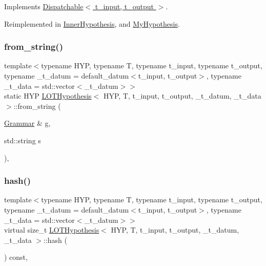 Implements \hyperlink{class_dispatchable_a6d2bd844b0e55378d29ed85e718d0a77}{Dispatchable$<$ t\+\_\+input, t\+\_\+output $>$}.



Reimplemented in \hyperlink{class_inner_hypothesis_a9aea852725a3798aafeae5e7a5a0736b}{Inner\+Hypothesis}, and \hyperlink{class_my_hypothesis_a3de47a545e8824bb8c63181965c62a01}{My\+Hypothesis}.

\mbox{\label{class_l_o_t_hypothesis_a684d3208f52e10c61418dc0707142a30}} 
\subsubsection{\texorpdfstring{from\+\_\+string()}{from\_string()}}
{\footnotesize\ttfamily template$<$typename H\+YP, typename T, typename t\+\_\+input, typename t\+\_\+output, typename \+\_\+t\+\_\+datum = default\+\_\+datum$<$t\+\_\+input, t\+\_\+output$>$, typename \+\_\+t\+\_\+data = std\+::vector$<$\+\_\+t\+\_\+datum$>$$>$ \\
static H\+YP \hyperlink{class_l_o_t_hypothesis}{L\+O\+T\+Hypothesis}$<$ H\+YP, T, t\+\_\+input, t\+\_\+output, \+\_\+t\+\_\+datum, \+\_\+t\+\_\+data $>$\+::from\+\_\+string (\begin{DoxyParamCaption}\item[{\hyperlink{class_grammar}{Grammar} \&}]{g,  }\item[{std\+::string}]{s }\end{DoxyParamCaption})\hspace{0.3cm}{\ttfamily [inline]}, {\ttfamily [static]}}

\mbox{\label{class_l_o_t_hypothesis_a8d269f6db62028468142df68ee225ea3}} 
\subsubsection{\texorpdfstring{hash()}{hash()}}
{\footnotesize\ttfamily template$<$typename H\+YP, typename T, typename t\+\_\+input, typename t\+\_\+output, typename \+\_\+t\+\_\+datum = default\+\_\+datum$<$t\+\_\+input, t\+\_\+output$>$, typename \+\_\+t\+\_\+data = std\+::vector$<$\+\_\+t\+\_\+datum$>$$>$ \\
virtual size\+\_\+t \hyperlink{class_l_o_t_hypothesis}{L\+O\+T\+Hypothesis}$<$ H\+YP, T, t\+\_\+input, t\+\_\+output, \+\_\+t\+\_\+datum, \+\_\+t\+\_\+data $>$\+::hash (\begin{DoxyParamCaption}{ }\end{DoxyParamCaption}) const\hspace{0.3cm}{\ttfamily [inline]}, {\ttfamily [virtual]}}



